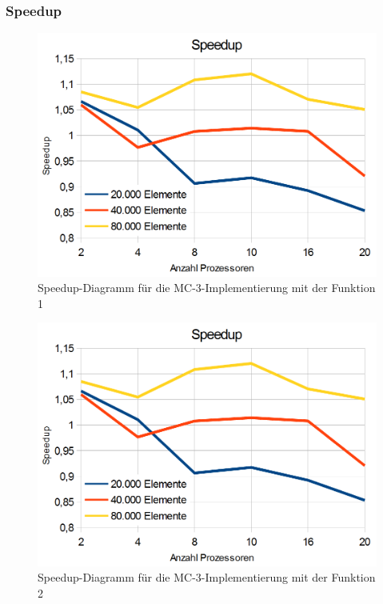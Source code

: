 \documentclass[a4paper,12pt]{scrartcl}
\begin{document}
\subsubsection{Speedup}
\begin{figure}[htb]
  \begin{center}
    \includegraphics[width=1\hsize]{../speedup.png}
  \end{center}
  \caption{\label{mpispeedup}
    Speedup-Diagramm f\"ur die MC-3-Implementierung mit der Funktion 1}
\end{figure}
\begin{figure}[htb]
  \begin{center}
    \includegraphics[width=1\hsize]{../speedup.png}
  \end{center}
  \caption{\label{mpispeedup}
    Speedup-Diagramm f\"ur die MC-3-Implementierung mit der Funktion 2}
\end{figure}
\end{document}
